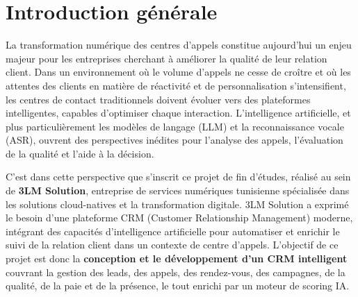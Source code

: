 \chapter*{Introduction générale}

\thispagestyle{fancy}


La transformation numérique des centres d'appels constitue aujourd'hui un enjeu
majeur pour les entreprises cherchant à améliorer la qualité de leur relation
client. Dans un environnement où le volume d'appels ne cesse de croître et où
les attentes des clients en matière de réactivité et de personnalisation
s'intensifient, les centres de contact traditionnels doivent évoluer vers des
plateformes intelligentes, capables d'optimiser chaque interaction.
L'intelligence artificielle, et plus particulièrement les modèles de langage
(LLM) et la reconnaissance vocale (ASR), ouvrent des perspectives inédites
pour l'analyse des appels, l'évaluation de la qualité et l'aide à la
décision.

C'est dans cette perspective que s'inscrit ce projet de fin d'études, réalisé
au sein de \textbf{3LM Solution}, entreprise de services numériques tunisienne
spécialisée dans les solutions cloud-natives et la transformation digitale.
3LM Solution a exprimé le besoin d'une plateforme CRM (Customer Relationship
Management) moderne, intégrant des capacités d'intelligence artificielle pour
automatiser et enrichir le suivi de la relation client dans un contexte de
centre d'appels. L'objectif de ce projet est donc la \textbf{conception et le
développement d'un CRM intelligent} couvrant la gestion des leads, des appels,
des rendez-vous, des campagnes, de la qualité, de la paie et de la présence,
le tout enrichi par un moteur de scoring IA.

